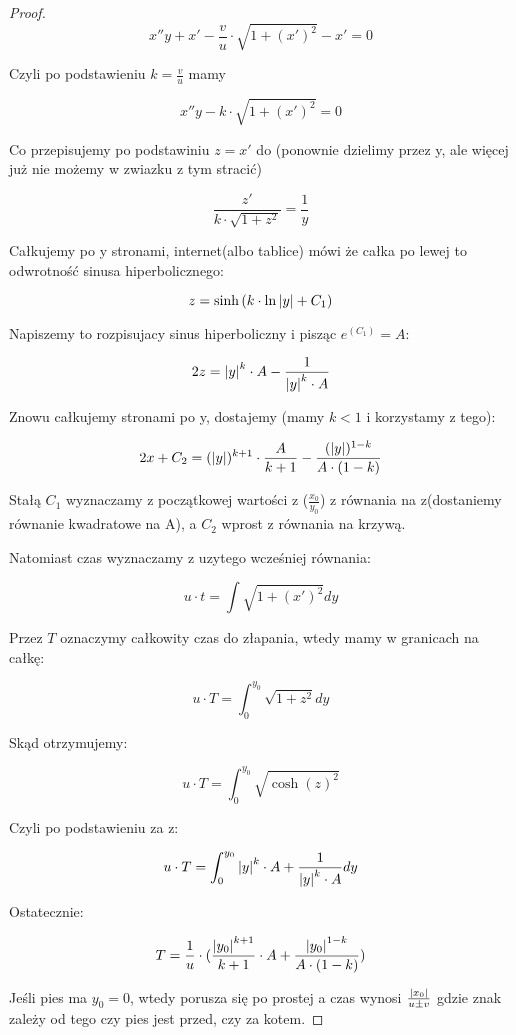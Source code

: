\documentclass[12pt]{article}
\begin{document}
\begin{proof}
\[ x''y + x' - \frac{v}{u} \cdot \sqrt{1 + (x')^2} - x' = 0 \]

Czyli po podstawieniu $ k = \frac{v}{u} $ mamy

\[ x''y - k \cdot \sqrt{1 + (x')^2} = 0 \]

Co przepisujemy po podstawiniu $ z = x' $ do (ponownie dzielimy przez y, ale więcej już nie możemy w zwiazku z tym stracić)

\[ \frac{z'}{k \cdot \sqrt{1 + z^2}} = \frac{1}{y} \]

Całkujemy po y stronami, internet(albo tablice) mówi że całka po lewej to odwrotność sinusa hiperbolicznego:

\[ z = \sinh{(k \cdot \ln{\abs{y}} + C_{1})} \]

Napiszemy to rozpisujacy sinus hiperboliczny i pisząc $e^(C_{1}) = A$:

\[ 2z = \abs{y}^k \cdot A - \frac{1}{\abs{y}^k \cdot A} \]

Znowu całkujemy stronami po y, dostajemy (mamy $ k < 1 $ i korzystamy z tego):

\[ 2x + C_{2} = (\abs{y})^{k+1} \cdot \frac{A}{k+1} - \frac{(\abs{y})^{1-k}}{A \cdot (1-k)}\]

Stałą $C_{1}$ wyznaczamy z początkowej wartości z ($ \frac{x_0}{y_0}$) z równania na z(dostaniemy równanie kwadratowe na A), a $C_{2}$ wprost z równania na krzywą.

Natomiast czas wyznaczamy z uzytego wcześniej równania:

\[ u \cdot t = \int{\sqrt{1 + (x')^2}} dy \]

Przez $T$ oznaczymy całkowity czas do złapania, wtedy mamy w granicach na całkę:

\[ u \cdot T = \int_{0}^{y_0} \sqrt{1 + z^2} dy\]

Skąd otrzymujemy:

\[ u \cdot T = \int_{0}^{y_0} \sqrt{\cosh(z)^2} \]

Czyli po podstawieniu za z: 

\[ u \cdot T = \int_{0}^{y_0} \abs{y}^k \cdot A + \frac{1}{\abs{y}^k \cdot A} dy \]

Ostatecznie:

\[ T = \frac{1}{u} \cdot (\frac{\abs{y_0}^{k+1}}{k+1} \cdot A + \frac{\abs{y_0}^{1-k}}{A \cdot (1-k)}) \]

Jeśli pies ma $y_0 = 0$, wtedy porusza się po prostej a czas wynosi $\frac{\abs{x_0}}{u \pm v}$ gdzie znak zależy od tego czy pies jest przed, czy za kotem.

\end{proof}
 
 
\end{document}
